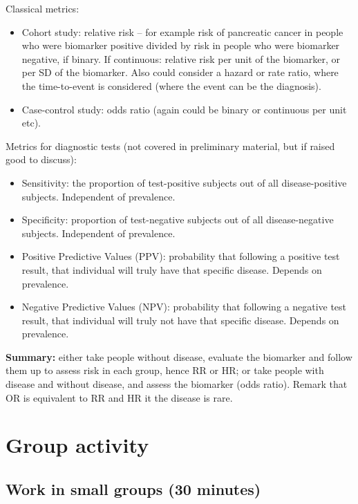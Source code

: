 \documentclass[a4paper,11pt]{scrartcl}
\theoremstyle{plain}
\theoremstyle{remark}
\theoremstyle{definition}
\begin{document}
\begin{itshape}
Classical metrics:
\begin{itemize}
\item Cohort study: relative risk – for example risk of pancreatic cancer in people who were biomarker positive divided by risk  in people who were biomarker negative, if binary. If continuous: relative risk per unit of the biomarker, or per SD of the biomarker. Also could consider a hazard or rate ratio, where the time-to-event is considered (where the event can be the diagnosis).
\item Case-control study:  odds ratio (again could be binary or continuous per unit etc).
\end{itemize}

Metrics for diagnostic tests (not covered in preliminary material, but if raised good to discuss):
\begin{itemize}
\item Sensitivity: the proportion of test-positive subjects out of all disease-positive subjects. Independent of prevalence.
\item Specificity: proportion of test-negative subjects out of all disease-negative subjects. Independent of prevalence.
\item Positive Predictive Values (PPV): probability that following a positive test result, that individual will truly have that specific disease. Depends on prevalence. 
\item Negative Predictive Values (NPV): probability that following a negative test result, that individual will truly not have that specific disease. Depends on prevalence. 
\end{itemize}

	\textbf{Summary:} either take people without disease, evaluate the biomarker and follow them up to assess risk in each group, hence RR or HR; or take people with disease and without disease, and assess the biomarker (odds ratio). Remark that OR is equivalent to RR and HR it the disease is rare.

\end{itshape}
\section{Group activity}

\subsection{Work in small groups (30 minutes)}
\end{document}
